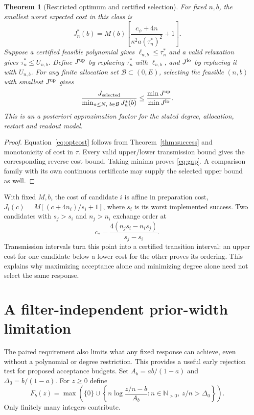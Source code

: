 \documentclass[11pt]{article}
\newtheorem{theorem}{Theorem}
\begin{document}
\begin{theorem}[Restricted optimum and certified selection]\label{thm:selection}
For fixed $n,b$, the smallest worst expected cost in this class is
\begin{equation}\label{eq:optcost}
 J_n^*(b)=M(b)\left[\frac{c_\psi+4n}{\kappa^2 a(\tau_n^*)^2}+1\right].
\end{equation}
Suppose a certified feasible polynomial gives $\ell_{n,b}\leq\tau_n^*$
and a valid relaxation gives $\tau_n^*\leq U_{n,b}$. Define $J^{\rm up}$
by replacing $\tau_n^*$ with $\ell_{n,b}$, and $J^{\rm lo}$ by replacing
it with $U_{n,b}$. For any finite allocation set $\mathcal B\subset(0,E)$,
selecting the feasible $(n,b)$ with smallest $J^{\rm up}$ gives
\begin{equation}\label{eq:gap}
 \frac{J_{\rm selected}}{\min_{n\leq N,\ b\in\mathcal B}J_n^*(b)}
 \leq \frac{\min J^{\rm up}}{\min J^{\rm lo}}.
\end{equation}
This is an a posteriori approximation factor for the stated degree,
allocation, restart and readout model.
\end{theorem}
\begin{proof}
Equation~\eqref{eq:optcost} follows from Theorem~\ref{thm:success} and
monotonicity of cost in $\tau$. Every valid upper/lower transmission
bound gives the corresponding reverse cost bound. Taking minima proves
\eqref{eq:gap}. A comparison family with its own continuous certificate
may supply the selected upper bound as well.
\end{proof}

With fixed $M,b$, the cost of candidate $i$ is affine in preparation cost,
$J_i(c)=M[(c+4n_i)/s_i+1]$, where $s_i$ is its worst implemented success.
Two candidates with $s_j>s_i$ and $n_j>n_i$ exchange order at
\begin{equation}\label{eq:crossover}
 c_* =\frac{4(n_j s_i-n_i s_j)}{s_j-s_i}.
\end{equation}
Transmission intervals turn this point into a certified transition
interval: an upper cost for one candidate below a lower cost for the
other proves its ordering. This explains why maximizing acceptance alone
and minimizing degree alone need not select the same response.

\section{A filter-independent prior-width limitation}\label{sec:prior-limit}
The paired requirement also limits what any fixed response can achieve,
even without a polynomial or degree restriction. This provides a useful
early rejection test for proposed acceptance budgets.
Set $A_b=ab/(1-a)$ and $\Delta_0=b/(1-a)$. For $z\geq0$ define
\begin{equation}\label{eq:F}
 F_b(z)=\max\left(\{0\}\cup
 \left\{n\log\frac{z/n-b}{A_b}:
 n\in\mathbb N_{>0},\ z/n>\Delta_0\right\}\right).
\end{equation}
Only finitely many integers contribute.
\end{document}

